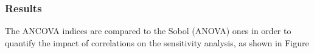
\subsubsection{Results}
The ANCOVA indices are compared to the Sobol (ANOVA) ones in order to quantify the impact of correlations on the sensitivity analysis, as shown in Figure %
